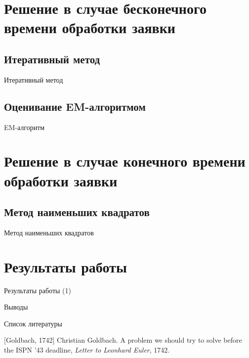 \documentclass[utf8]{beamer}
\begin{document}
\section[$\lambda_c \approx 0$]{Решение в случае бесконечного времени обработки заявки}
\subsection{Итеративный метод}
\begin{frame}{Итеративный метод}
\end{frame}

\subsection[EM-алгоритм]{Оценивание EM-алгоритмом}
\begin{frame}{EM-алгоритм}
\end{frame}

\section[$\lambda_c \gg 0$]{Решение в случае конечного времени обработки заявки}
\subsection[МНК]{Метод наименьших квадратов}
\begin{frame}{Метод наименьших квадратов}
\end{frame}

\section{Результаты работы}
\begin{frame}{Результаты работы (1)}
\end{frame}

\begin{frame}{Выводы}
\end{frame}

\begin{frame}{Список литературы}
  \begin{thebibliography}{10}
    [Goldbach, 1742] Christian Goldbach.
    \newblock A problem we should try to solve before the ISPN ’43 deadline,
    \newblock \emph{Letter to Leonhard Euler}, 1742.
  \end{thebibliography}
\end{frame}
\end{document}
